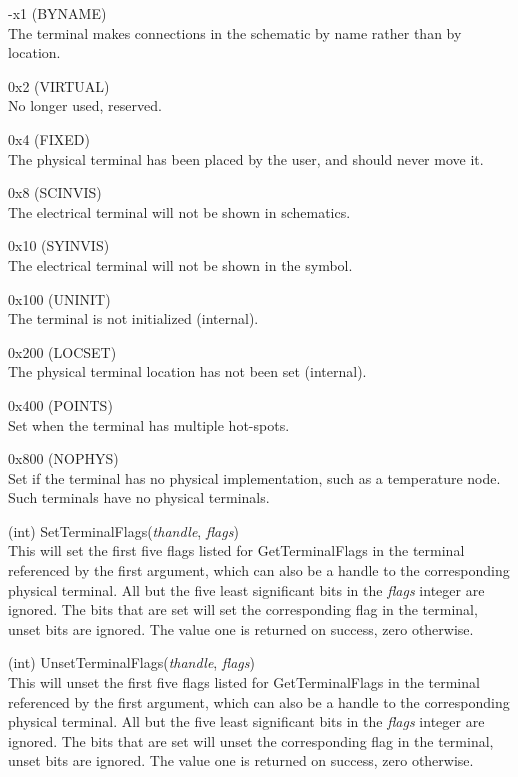 \begin{description}
\begin{description}
\item{{\vt -x1} ({\vt BYNAME})}\\
The terminal makes connections in the schematic by name rather   
than by location.   
\item{{\vt 0x2} ({\vt VIRTUAL})}\\
No longer used, reserved.
\item{{\vt 0x4} ({\vt FIXED})}\\
The physical terminal has been placed by the user, and {\Xic}
should never move it.   
\item{{\vt 0x8} ({\vt SCINVIS})}\\
The electrical terminal will not be shown in schematics.   
\item{{\vt 0x10} ({\vt SYINVIS})}\\
The electrical terminal will not be shown in the symbol.   
\item{{\vt 0x100} ({\vt UNINIT})}\\
The terminal is not initialized (internal).
\item{{\vt 0x200} ({\vt LOCSET})}\\
The physical terminal location has not been set (internal).   
\item{{\vt 0x400} ({\vt POINTS})}\\
Set when the terminal has multiple hot-spots.
\item{{\vt 0x800} ({\vt NOPHYS})}\\
Set if the terminal has no physical implementation, such as a
temperature node.  Such terminals have no physical terminals.
\end{description}

\item{(int) \vt SetTerminalFlags({\it thandle\/}, {\it flags\/})}\\
This will set the first five flags listed for {\vt GetTerminalFlags}
in the terminal referenced by the first argument, which can also be a
handle to the corresponding physical terminal.  All but the five least
significant bits in the {\it flags} integer are ignored.  The bits
that are set will set the corresponding flag in the terminal, unset
bits are ignored.  The value one is returned on success, zero
otherwise.

\item{(int) \vt UnsetTerminalFlags({\it thandle\/}, {\it flags\/})}\\
This will unset the first five flags listed for {\vt GetTerminalFlags}
in the terminal referenced by the first argument, which can also be a
handle to the corresponding physical terminal.  All but the five least
significant bits in the {\it flags} integer are ignored.  The bits
that are set will unset the corresponding flag in the terminal, unset
bits are ignored.  The value one is returned on success, zero
otherwise.


\end{description}
